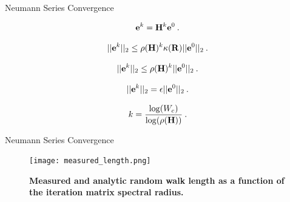 \documentclass{beamer}
\begin{document}
\begin{frame}{Neumann Series Convergence}

\begin{equation}
  \mathbf{e}^{k} = \mathbf{H}^k\mathbf{e}^0\:. 
  \label{eq:linear_k_iter_error}
\end{equation}

\begin{equation}
  ||\mathbf{e}^{k}||_2 \leq \rho(\mathbf{H})^k \kappa(\mathbf{R})
  ||\mathbf{e}^0||_2\:.
  \label{eq:linear_k_iter_norm2}
\end{equation}

\begin{equation}
  ||\mathbf{e}^{k}||_2 \leq \rho(\mathbf{H})^k ||\mathbf{e}^0||_2\:.
  \label{eq:linear_k_iter_norm3}
\end{equation}

\begin{equation}
  ||\mathbf{e}^{k}||_2 = \epsilon ||\mathbf{e}^0||_2\:.
  \label{eq:linear_k_iter_norm4}
\end{equation}

\begin{equation}
  k = \frac{ \log(W_c) }{ \log( \rho(\mathbf{H}) ) }\:.
  \label{eq:analytic_k}
\end{equation}

\end{frame}

\begin{frame}{Neumann Series Convergence}

\begin{figure}[t!]
  \begin{center}
    \texttt{[image: measured\_length.png]}
  \end{center}
  \caption{\textbf{Measured and analytic random walk length as a
      function of the iteration matrix spectral radius.}}
  \label{fig:measured_length}
\end{figure}

\end{frame}
\end{document}
